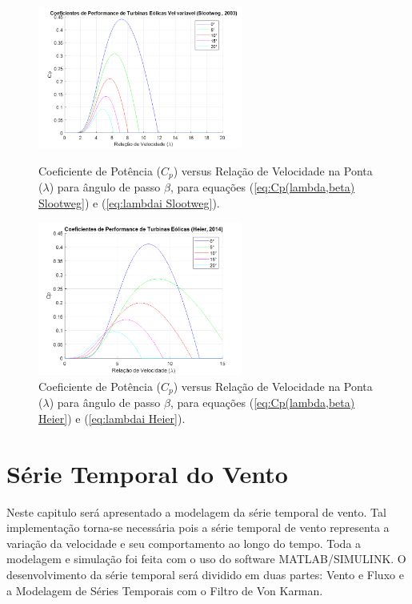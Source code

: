     \begin{figure}[H]
        \centering
        \caption{Coeficiente de Potência ($C_p$) versus Relação de Velocidade na Ponta ($\lambda$) para ângulo de passo $\beta$, para equações (\ref{eq:Cp(lambda,beta) Slootweg}) e (\ref{eq:lambdai Slootweg}).}
        \includegraphics[width=0.6\textwidth]{Figuras/Teorico/graph2.png} %
        \label{fig:graph2}
    \end{figure}
    
    \begin{figure}[H]
        \centering
        \caption{Coeficiente de Potência ($C_p$) versus Relação de Velocidade na Ponta ($\lambda$) para ângulo de passo $\beta$, para equações (\ref{eq:Cp(lambda,beta) Heier}) e (\ref{eq:lambdai Heier}).}
        \includegraphics[width=0.6\textwidth]{Figuras/Teorico/graph3.png} %

        \label{fig:graph3}        
    \end{figure}
    
\section{Série Temporal do Vento}


\par Neste capitulo será apresentado a modelagem da série temporal de vento. Tal implementação torna-se necessária pois a série temporal de vento representa a variação da velocidade e seu comportamento ao longo do tempo. Toda a modelagem e simulação foi feita com o uso do software MATLAB/SIMULINK. O desenvolvimento da série temporal será dividido em duas partes: Vento e Fluxo e a Modelagem de Séries Temporais com o Filtro de Von Karman.

